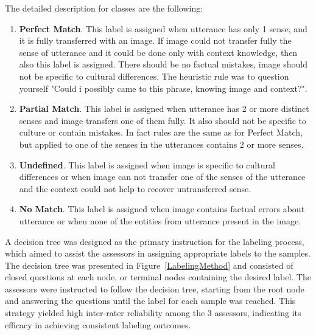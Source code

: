 The detailed description for classes are the following:

\begin{enumerate}
    \item \textbf{Perfect Match}. This label is assigned when utterance has only 1 sense, and it is fully transferred with an image. If image could not transfer fully the sense of utterance and it could be done only with context knowledge, then also this label is assigned. There should be no factual mistakes, image should not be specific to cultural differences. The heuristic rule was to question yourself "Could i possibly came to this phrase, knowing image and context?". 
    \item \textbf{Partial Match}. This label is assigned when utterance has 2 or more distinct senses and image transfers one of them fully. It also should not be specific to culture or contain mistakes. In fact rules are the same as for Perfect Match, but applied to one of the senses in the utterances contains 2 or more senses.
    \item \textbf{Undefined}. This label is assigned when image is specific to cultural differences or when image can not transfer one of the senses of the utterance and the context could not help to recover untransferred sense.
    \item \textbf{No Match}. This label is assigned when image contains factual errors about utterance or when none of the entities from utterance present in the image.
\end{enumerate}

\smallskip

A decision tree was designed as the primary instruction for the labeling process, which aimed to assist the assessors in assigning appropriate labels to the samples. The decision tree was presented in Figure~\ref{LabelingMethod} and consisted of closed questions at each node, or terminal nodes containing the desired label. The assessors were instructed to follow the decision tree, starting from the root node and answering the questions until the label for each sample was reached. This strategy yielded high inter-rater reliability among the 3 assessors, indicating its efficacy in achieving consistent labeling outcomes.

